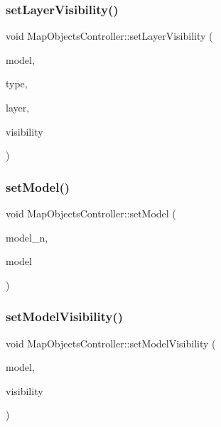 \subsubsection{\texorpdfstring{setLayerVisibility()}{setLayerVisibility()}}
{\footnotesize\ttfamily void Map\+Objects\+Controller\+::set\+Layer\+Visibility (\begin{DoxyParamCaption}\item[{int}]{model,  }\item[{\mbox{\hyperlink{class_object_tree_model_a379e9d6b0d381853785adf62095ba4e3}{Object\+Tree\+Model\+::\+Category}}}]{type,  }\item[{int}]{layer,  }\item[{bool}]{visibility }\end{DoxyParamCaption})}

\mbox{\label{class_map_objects_controller_a163e83870c660dc1ed9abd3d044ee0ec}} 
\subsubsection{\texorpdfstring{setModel()}{setModel()}}
{\footnotesize\ttfamily void Map\+Objects\+Controller\+::set\+Model (\begin{DoxyParamCaption}\item[{int}]{model\+\_\+n,  }\item[{std\+::shared\+\_\+ptr$<$ \mbox{\hyperlink{class_displace_model}{Displace\+Model}} $>$}]{model }\end{DoxyParamCaption})}

\mbox{\label{class_map_objects_controller_a42fbe3d3a5e2971b4b2bfdbf17479fc7}} 
\subsubsection{\texorpdfstring{setModelVisibility()}{setModelVisibility()}}
{\footnotesize\ttfamily void Map\+Objects\+Controller\+::set\+Model\+Visibility (\begin{DoxyParamCaption}\item[{int}]{model,  }\item[{\mbox{\hyperlink{class_map_objects_controller_ae9f927453172ea1c7eca82b05054bc35}{Map\+Objects\+Controller\+::\+Visibility}}}]{visibility }\end{DoxyParamCaption})}



